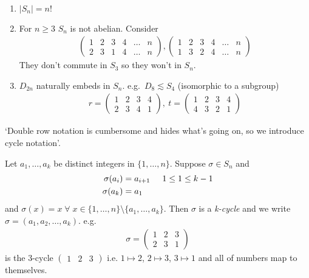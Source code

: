 \begin{remark} ~
\begin{enumerate}
\def\labelenumi{\roman{enumi}.}
\item
  $|S_n| = n!$
\item
  For $n \geq 3$ $S_n$ is not abelian.
  Consider
  \begin{align*}
  \begin{pmatrix}
  1 & 2 & 3 & 4 & \ldots & n \\
  2 & 3 & 1 & 4 & \ldots & n
  \end{pmatrix}, 
  \begin{pmatrix}
      1 & 2 & 3 & 4 & \ldots & n \\
      1 & 3 & 2 & 4 & \ldots & n
  \end{pmatrix}
  \end{align*}
  They don't commute in $S_3$ so they won't in $S_n$.
\item
  $D_{2n}$ naturally embeds in $S_n$.
  e.g.~$D_8 \lesssim S_4$ (isomorphic to a subgroup)
  \begin{align*}
      r = \begin{pmatrix}
      1 & 2 & 3 & 4 \\
      2 & 3 & 4 & 1
      \end{pmatrix},\ t = 
      \begin{pmatrix}
      1 & 2 & 3 & 4 \\
      4 & 3 & 2 & 1
      \end{pmatrix}
  \end{align*}
\end{enumerate}

\end{remark}

`Double row notation is cumbersome and hides what's going on, so we introduce cycle notation'.

\begin{definition}
Let $a_1, \ldots, a_k$ be distinct integers in $\{ 1, \ldots, n \}$.
Suppose $\sigma \in S_n$ and
\begin{align*}
    \sigma(a_i) &= a_{i + 1} \hspace{0.5cm} 1 \leq 1 \leq k - 1 \\
    \sigma(a_k) &= a_1
\end{align*}
and $\sigma(x) = x \; \forall \; x \in \{ 1, \ldots, n \} \setminus \{ a_1, \ldots, a_k \}$.
Then $\sigma$ is a \emph{k-cycle} and we write $\sigma = (a_1, a_2, \ldots, a_k)$.
e.g.~\begin{align*}
    \sigma = \begin{pmatrix}
    1 & 2 & 3 \\
    2 & 3 & 1
    \end{pmatrix}
\end{align*} is the 3-cycle $\begin{pmatrix}1 & 2 & 3\end{pmatrix}$ i.e. $1 \mapsto 2$, $2\mapsto 3$, $3\mapsto 1$ and all of numbers map to themselves.
\end{definition}

